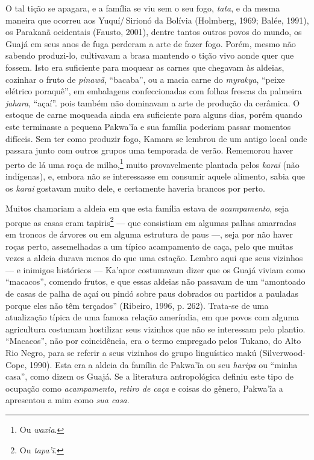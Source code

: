 O tal tição se apagara, e a família se viu sem o seu fogo,
\textit{tata}, e da mesma maneira que ocorreu aos Yuquí/\,Sirionó da Bolívia
(Holmberg, 1969; Balée, 1991), os Parakanã ocidentais (Fausto, 2001),
dentre tantos outros povos do mundo, os Guajá em seus anos de fuga
perderam a arte de fazer fogo. Porém, mesmo não sabendo produzi-lo,
cultivavam a brasa mantendo o tição vivo aonde quer que fossem. Isto era
suficiente para moquear as carnes que chegavam às aldeias, cozinhar o
fruto de \textit{pinawã}, ``bacaba'', ou a macia carne do \textit{myrakya}, ``peixe elétrico
poraquê'', em embalagens confeccionadas com folhas frescas
da palmeira \textit{jahara}, ``açaí''. pois também não dominavam a arte de
produção da cerâmica. O estoque de carne moqueada ainda era suficiente
para alguns dias, porém quando este terminasse a pequena Pakwa'ĩa e sua
família poderiam passar momentos difíceis. Sem ter como produzir fogo,
Kamara se lembrou de um antigo local onde passara junto com outros
grupos uma temporada de verão. Rememorou haver perto de lá uma roça de
milho,\footnote{Ou \textit{waxia}.} muito provavelmente plantada pelos \textit{karai}
(não indígenas), e, embora não se interessasse em consumir aquele
alimento, sabia que os \textit{karai} gostavam muito dele, e certamente
haveria brancos por perto.

Muitos chamariam a aldeia em que esta família estava de \textit{acampamento},
seja porque as casas eram tapiris\footnote{Ou \textit{tapa'ĩ}.} --- que consistiam em
algumas palhas amarradas em troncos de árvores ou em alguma estrutura de
paus ---, seja por não haver roças perto, assemelhadas a um típico
acampamento de caça, pelo que muitas vezes a aldeia durava menos do que
uma estação. Lembro aqui que seus vizinhos --- e inimigos históricos ---
Ka'apor costumavam dizer que os Guajá viviam como ``macacos'', comendo
frutos, e que essas aldeias não passavam de um ``amontoado de casas de
palha de açaí ou pindó sobre paus dobrados ou partidos a pauladas porque
eles não têm terçados'' (Ribeiro, 1996, p. 262). Trata-se de uma
atualização típica de uma famosa relação ameríndia, em que povos com
alguma agricultura costumam hostilizar seus vizinhos que não se
interessam pelo plantio. ``Macacos'', não por coincidência, era o termo
empregado pelos Tukano, do Alto Rio Negro, para se referir a seus
vizinhos do grupo linguístico makú (Silverwood-Cope, 1990). Esta era a
aldeia da família de Pakwa'ĩa ou seu \textit{haripa} ou ``minha casa'',
como dizem os Guajá. Se a literatura antropológica definiu este tipo de
ocupação como \textit{acampamento}, \textit{retiro de caça} e coisas do gênero,
Pakwa'ĩa a apresentou a mim como \textit{sua casa}.

